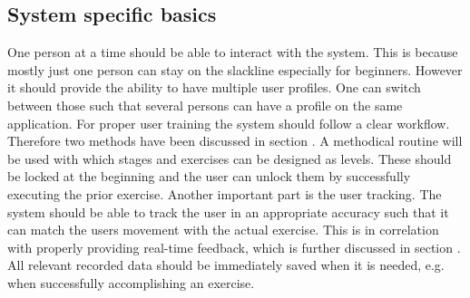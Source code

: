 \subsection{System specific basics}\label{systemBasics}
One person at a time should be able to interact with the system. This is because mostly just one person can stay on the slackline especially for beginners. However it should provide the ability to have multiple user profiles. One can switch between those such that several persons can have a profile on the same application. For proper user training the system should follow a clear workflow. Therefore two methods have been discussed in section \textit{}. A methodical routine will be used with which stages and exercises can be designed as levels. These should be locked at the beginning and the user can unlock them by successfully executing the prior exercise. Another important part is the user tracking. The system should be able to track the user in an appropriate accuracy such that it can match the users movement with the actual exercise. This is in correlation with properly providing real-time feedback, which is further discussed in section \textit{}. All relevant recorded data should be immediately saved when it is needed, e.g. when successfully accomplishing an exercise.

\begin{comment}
- System should be able to track user appropriately
- All relevant data should be immediately saved when it is needed (unlocking exercise/stage, failing/accomplish exercise)
- Information about where the user currently is should be given --> title
- User selection
- Also a possibility to go to the last screen if she misclicks should be given.
\end{comment}